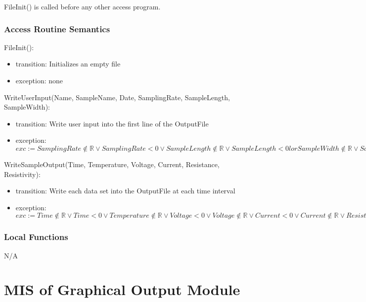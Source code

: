 \documentclass[12pt, titlepage]{article}
\begin{document}
FileInit() is called before any other access program. 

\subsubsection{Access Routine Semantics}

\noindent FileInit():
\begin{itemize}
\item transition: Initializes an empty file
\item exception: none
\end{itemize}

\noindent WriteUserInput(Name, SampleName, Date, SamplingRate, SampleLength, SampleWidth):
\begin{itemize}
\item transition: Write user input into the first line of the OutputFile 
\item exception: $exc:= SamplingRate \notin \mathbb{R} \lor SamplingRate < 0 \lor SampleLength \notin \mathbb{R} \lor SampleLength < 0 lor SampleWidth \notin \mathbb{R} \lor SampleWidth < 0 \Rightarrow INVALID$
\end{itemize}

\noindent WriteSampleOutput(Time, Temperature, Voltage, Current, Resistance, Resistivity):
\begin{itemize}
\item transition: Write each data set into the OutputFile at each time interval
\item exception: $exc:= Time \notin  \mathbb{R} \lor Time < 0 \lor  Temperature \notin  \mathbb{R} \lor Voltage < 0 \lor  Voltage \notin  \mathbb{R} \lor Current < 0 \lor  Current \notin  \mathbb{R} \lor Resistance < 0 \lor  Resistance \notin  \mathbb{R} \lor Resistivity < 0\lor  Resistance \notin  \mathbb{R} \lor Resistivity < 0\Rightarrow INVALID$
\end{itemize}

\subsubsection{Local Functions}

N/A

\newpage

\section{MIS of Graphical Output Module} \label{GO} 
\end{document}
